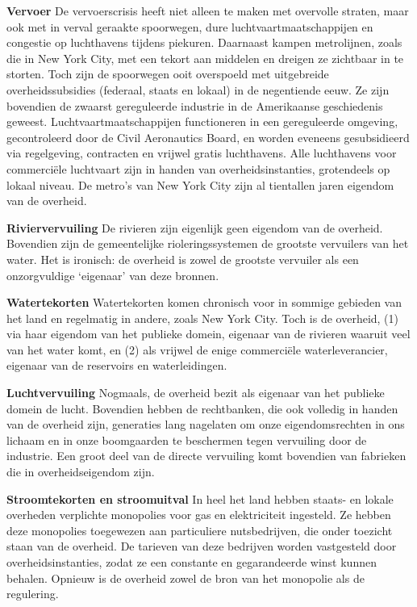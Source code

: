 \documentclass[
  a5paper,
  smalldemyvopaper,10pt,twoside,onecolumn,openright,extrafontsizes,hidelinks]{memoir}
\begin{document}
\textbf{Vervoer} De vervoerscrisis heeft niet alleen te maken met
overvolle straten, maar ook met in verval geraakte spoorwegen, dure
luchtvaartmaatschappijen en congestie op luchthavens tijdens piekuren.
Daarnaast kampen metrolijnen, zoals die in New York City, met een tekort
aan middelen en dreigen ze zichtbaar in te storten. Toch zijn de
spoorwegen ooit overspoeld met uitgebreide overheidssubsidies (federaal,
staats en lokaal) in de negentiende eeuw. Ze zijn bovendien de zwaarst
gereguleerde industrie in de Amerikaanse geschiedenis geweest.
Luchtvaartmaatschappijen functioneren in een gereguleerde omgeving,
gecontroleerd door de Civil Aeronautics Board, en worden eveneens
gesubsidieerd via regelgeving, contracten en vrijwel gratis luchthavens.
Alle luchthavens voor commerciële luchtvaart zijn in handen van
overheidsinstanties, grotendeels op lokaal niveau. De metro's van New
York City zijn al tientallen jaren eigendom van de overheid.

\textbf{Riviervervuiling} De rivieren zijn eigenlijk geen eigendom van
de overheid. Bovendien zijn de gemeentelijke rioleringssystemen de
grootste vervuilers van het water. Het is ironisch: de overheid is zowel
de grootste vervuiler als een onzorgvuldige `eigenaar' van deze bronnen.

\textbf{Watertekorten} Watertekorten komen chronisch voor in sommige
gebieden van het land en regelmatig in andere, zoals New York City. Toch
is de overheid, (1) via haar eigendom van het publieke domein, eigenaar
van de rivieren waaruit veel van het water komt, en (2) als vrijwel de
enige commerciële waterleverancier, eigenaar van de reservoirs en
waterleidingen.

\textbf{Luchtvervuiling} Nogmaals, de overheid bezit als eigenaar van
het publieke domein de lucht. Bovendien hebben de rechtbanken, die ook
volledig in handen van de overheid zijn, generaties lang nagelaten om
onze eigendomsrechten in ons lichaam en in onze boomgaarden te
beschermen tegen vervuiling door de industrie. Een groot deel van de
directe vervuiling komt bovendien van fabrieken die in overheidseigendom
zijn.

\textbf{Stroomtekorten en stroomuitval} In heel het land hebben staats-
en lokale overheden verplichte monopolies voor gas en elektriciteit
ingesteld. Ze hebben deze monopolies toegewezen aan particuliere
nutsbedrijven, die onder toezicht staan van de overheid. De tarieven van
deze bedrijven worden vastgesteld door overheidsinstanties, zodat ze een
constante en gegarandeerde winst kunnen behalen. Opnieuw is de overheid
zowel de bron van het monopolie als de regulering.
\end{document}
